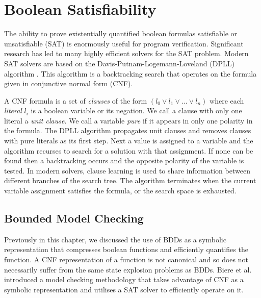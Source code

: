 \section{Boolean Satisfiability}

The ability to prove existentially quantified boolean formulas satisfiable or
unsatisfiable (SAT) is enormously useful for program verification. Significant
research has led to many highly efficient solvers for the SAT problem. Modern
SAT solvers are based on the Davis-Putnam-Logemann-Loveland (DPLL) algorithm
\cite{Davis60, Davis62}. This algorithm is a backtracking search that operates
on the formula given in conjunctive normal form (CNF).

A CNF formula is a set of \emph{clauses} of the form $(l_0 \lor l_1 \lor ...
\lor l_n)$ where each \emph{literal} $l_i$ is a boolean variable or its
negation. We call a clause with only one literal a \emph{unit clause}. We call
a variable \emph{pure} if it appears in only one polarity in the formula. The
DPLL algorithm propagates unit clauses and removes clauses with pure literals
as its first step. Next a value is assigned to a variable and the algorithm recurses to search for a solution with that assignment. If none can be found then a backtracking occurs and the opposite polarity of the variable is tested. In modern solvers, clause learning is used to share information between different branches of the search tree. The algorithm terminates when the current variable assignment satisfies the formula, or the search space is exhausted.

\subsection{Bounded Model Checking}
\label{sec:boundedmodelchecking}

Previously in this chapter, we discussed the use of BDDs as a symbolic representation that compresses boolean functions and efficiently quantifies the function. A CNF representation of a function is not canonical and so does not necessarily suffer from the same state explosion problems as BDDs. Biere et al.~\cite{Biere99} introduced a model checking methodology that takes advantage of CNF as a symbolic representation and utilises a SAT solver to efficiently operate on it. 



